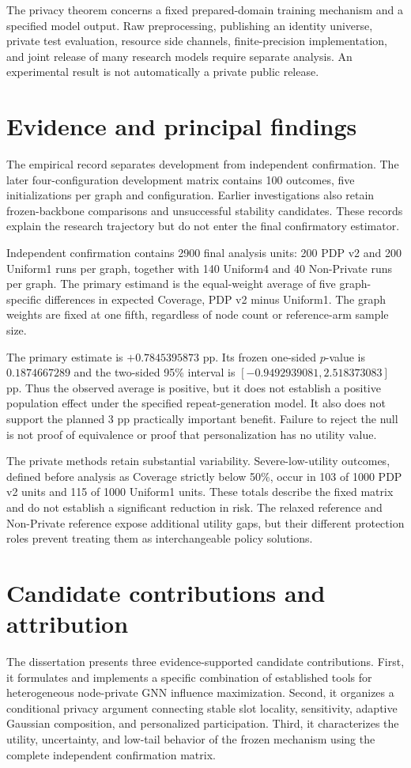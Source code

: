 The privacy theorem concerns a fixed prepared-domain training mechanism and a specified model output. Raw preprocessing, publishing an identity universe, private test evaluation, resource side channels, finite-precision implementation, and joint release of many research models require separate analysis. An experimental result is not automatically a private public release.

\section{Evidence and principal findings}
The empirical record separates development from independent confirmation. The later four-configuration development matrix contains 100 outcomes, five initializations per graph and configuration. Earlier investigations also retain frozen-backbone comparisons and unsuccessful stability candidates. These records explain the research trajectory but do not enter the final confirmatory estimator.

Independent confirmation contains 2900 final analysis units: 200 PDP v2 and 200 Uniform1 runs per graph, together with 140 Uniform4 and 40 Non-Private runs per graph. The primary estimand is the equal-weight average of five graph-specific differences in expected Coverage, PDP v2 minus Uniform1. The graph weights are fixed at one fifth, regardless of node count or reference-arm sample size.

The primary estimate is $+0.7845395873$ pp. Its frozen one-sided $p$-value is $0.1874667289$ and the two-sided 95\% interval is $[-0.9492939081,2.518373083]$ pp. Thus the observed average is positive, but it does not establish a positive population effect under the specified repeat-generation model. It also does not support the planned 3 pp practically important benefit. Failure to reject the null is not proof of equivalence or proof that personalization has no utility value.

The private methods retain substantial variability. Severe-low-utility outcomes, defined before analysis as Coverage strictly below 50\%, occur in 103 of 1000 PDP v2 units and 115 of 1000 Uniform1 units. These totals describe the fixed matrix and do not establish a significant reduction in risk. The relaxed reference and Non-Private reference expose additional utility gaps, but their different protection roles prevent treating them as interchangeable policy solutions.

\section{Candidate contributions and attribution}
The dissertation presents three evidence-supported candidate contributions. First, it formulates and implements a specific combination of established tools for heterogeneous node-private GNN influence maximization. Second, it organizes a conditional privacy argument connecting stable slot locality, sensitivity, adaptive Gaussian composition, and personalized participation. Third, it characterizes the utility, uncertainty, and low-tail behavior of the frozen mechanism using the complete independent confirmation matrix.


